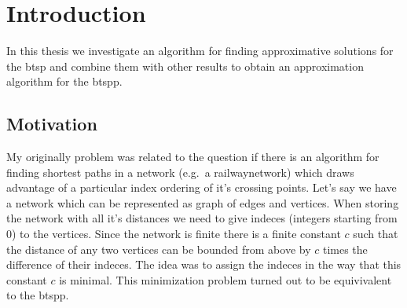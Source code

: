 \chapter{Introduction}

In this thesis we investigate an algorithm for finding approximative solutions for the \ac{btsp} and combine them with other results to obtain an approximation algorithm for the \ac{btspp}.


\section{Motivation}
My originally problem was related to the question if there is an algorithm for finding shortest paths in a network (e.g.\ a railwaynetwork) which draws advantage of a particular index ordering of it's crossing points.
Let's say we have a network which can be represented as graph of edges and vertices. When storing the network with all it's distances we need to give indeces (integers starting from 0) to the vertices. Since the network is finite there is a finite constant \(c\) such that the distance of any two vertices can be bounded from above by \(c\) times the difference of their indeces. The idea was to assign the indeces in the way that this constant \(c\) is minimal.
This minimization problem turned out to be equivivalent to the \ac{btspp}.